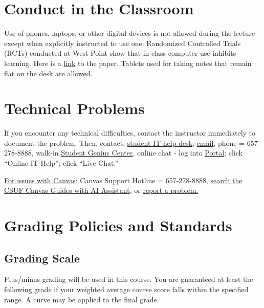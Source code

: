 \documentclass{./../Latex/syllabus}
\begin{document}
\section*{Conduct in the Classroom}
Use of phones, laptops, or other digital devices is not allowed during the lecture except when explicitly instructed to use one. Randomized Controlled Trials (RCTs) conducted at West Point show that in-class computer use inhibits learning. Here is a \href{https://oema.army.mil/pub/2017_Carter_Greenberg_Walker_Computer_Usage_RCT_USMA.pdf}{link} to the paper. Tablets used for taking notes that remain flat on the desk are allowed.

\section*{Technical Problems}
If you encounter any technical difficulties, contact the instructor immediately to document the problem. Then, contact: \href{https://www.fullerton.edu/it/services/helpdesk/}{student IT help desk}, \href{mailto:StudentITHelpDesk@fullerton.edu}{email}, phone = 657-278-8888, walk-in \href{http://www.fullerton.edu/it/students/sgc/index.php}{Student Genius Center}, online chat - log into \href{http://my.fullerton.edu}{Portal}; click ``Online IT Help''; click ``Live Chat.''

\noindent \underline{For issues with Canvas}: Canvas Support Hotline = 657-278-8888, \href{https://canvashelp.fullerton.edu/}{search the CSUF Canvas Guides with AI Assistant}, or \href{https://titans.service-now.com/sp?id=sc_cat_item&sys_id=f88efe80ebea6a10fb7cfcffcad0cdc6&subject=Canvas}{report a problem.}

\section*{Grading Policies and Standards}

\subsection*{Grading Scale}

Plus/minus grading will be used in this course. You are guaranteed at least the following grade if your weighted average course score falls within the specified range. A curve may be applied to the final grade.
\end{document}
